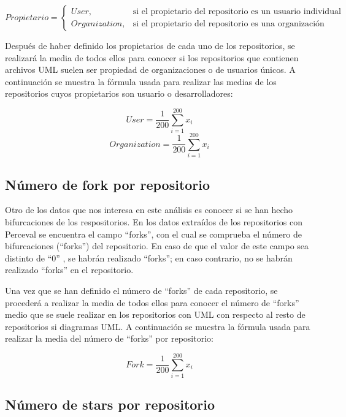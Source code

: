 \documentclass[a4paper, 12pt]{book}
\begin{document}
\begin{equation}
  Propietario =
  \begin{cases}
  User, & \text{si el propietario del repositorio es un usuario individual} \\
  Organization, & \text{si el propietario del repositorio es una organización}
  \end{cases}
\end{equation}

Después de haber definido los propietarios de cada uno de los repositorios, se realizará la media de todos ellos para conocer si los repositorios que contienen archivos UML suelen ser propiedad de organizaciones o de usuarios únicos.
A continuación se muestra la fórmula usada para realizar las medias de los repositorios cuyos propietarios son usuario o desarrolladores:

\[{User} = \frac{1}{200} \sum_{i=1}^{200} x_i\]
\[{Organization} = \frac{1}{200} \sum_{i=1}^{200} x_i\]


\subsection{Número de fork por repositorio} %
\label{sec:Número de fork por repositorio}

Otro de los datos que nos interesa en este análisis es conocer si se han hecho bifurcaciones de los respositorios.
En los datos extraídos de los repositorios con Perceval se encuentra el campo ``forks'', con el cual se comprueba el número de bifurcaciones (``forks'') del repositorio.
En caso de que el valor de este campo sea distinto de ``0'' , se habrán realizado ``forks''; en caso contrario, no se habrán realizado ``forks'' en el repositorio.


Una vez que se han definido el número de ``forks'' de cada repositorio, se procederá a realizar la media de todos ellos para conocer el número de ``forks'' medio que se suele realizar en los repositorios con UML con respecto al resto de repositorios si diagramas UML.
A continuación se muestra la fórmula usada para realizar la media del número de ``forks'' por repositorio:


\[{Fork} = \frac{1}{200} \sum_{i=1}^{200} x_i\]


\subsection{Número de stars por repositorio} %
\label{sec:número de stars por repositorio}
\end{document}
